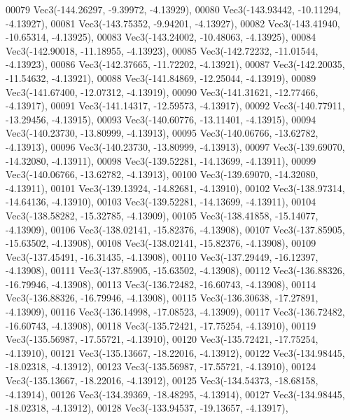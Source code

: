 \begin{DoxyCode}
00079         Vec3(-144.26297, -9.39972, -4.13929),
00080         Vec3(-143.93442, -10.11294, -4.13927),
00081         Vec3(-143.75352, -9.94201, -4.13927),
00082         Vec3(-143.41940, -10.65314, -4.13925),
00083         Vec3(-143.24002, -10.48063, -4.13925),
00084         Vec3(-142.90018, -11.18955, -4.13923),
00085         Vec3(-142.72232, -11.01544, -4.13923),
00086         Vec3(-142.37665, -11.72202, -4.13921),
00087         Vec3(-142.20035, -11.54632, -4.13921),
00088         Vec3(-141.84869, -12.25044, -4.13919),
00089         Vec3(-141.67400, -12.07312, -4.13919),
00090         Vec3(-141.31621, -12.77466, -4.13917),
00091         Vec3(-141.14317, -12.59573, -4.13917),
00092         Vec3(-140.77911, -13.29456, -4.13915),
00093         Vec3(-140.60776, -13.11401, -4.13915),
00094         Vec3(-140.23730, -13.80999, -4.13913),
00095         Vec3(-140.06766, -13.62782, -4.13913),
00096         Vec3(-140.23730, -13.80999, -4.13913),
00097         Vec3(-139.69070, -14.32080, -4.13911),
00098         Vec3(-139.52281, -14.13699, -4.13911),
00099         Vec3(-140.06766, -13.62782, -4.13913),
00100         Vec3(-139.69070, -14.32080, -4.13911),
00101         Vec3(-139.13924, -14.82681, -4.13910),
00102         Vec3(-138.97314, -14.64136, -4.13910),
00103         Vec3(-139.52281, -14.13699, -4.13911),
00104         Vec3(-138.58282, -15.32785, -4.13909),
00105         Vec3(-138.41858, -15.14077, -4.13909),
00106         Vec3(-138.02141, -15.82376, -4.13908),
00107         Vec3(-137.85905, -15.63502, -4.13908),
00108         Vec3(-138.02141, -15.82376, -4.13908),
00109         Vec3(-137.45491, -16.31435, -4.13908),
00110         Vec3(-137.29449, -16.12397, -4.13908),
00111         Vec3(-137.85905, -15.63502, -4.13908),
00112         Vec3(-136.88326, -16.79946, -4.13908),
00113         Vec3(-136.72482, -16.60743, -4.13908),
00114         Vec3(-136.88326, -16.79946, -4.13908),
00115         Vec3(-136.30638, -17.27891, -4.13909),
00116         Vec3(-136.14998, -17.08523, -4.13909),
00117         Vec3(-136.72482, -16.60743, -4.13908),
00118         Vec3(-135.72421, -17.75254, -4.13910),
00119         Vec3(-135.56987, -17.55721, -4.13910),
00120         Vec3(-135.72421, -17.75254, -4.13910),
00121         Vec3(-135.13667, -18.22016, -4.13912),
00122         Vec3(-134.98445, -18.02318, -4.13912),
00123         Vec3(-135.56987, -17.55721, -4.13910),
00124         Vec3(-135.13667, -18.22016, -4.13912),
00125         Vec3(-134.54373, -18.68158, -4.13914),
00126         Vec3(-134.39369, -18.48295, -4.13914),
00127         Vec3(-134.98445, -18.02318, -4.13912),
00128         Vec3(-133.94537, -19.13657, -4.13917),

\end{DoxyCode}

